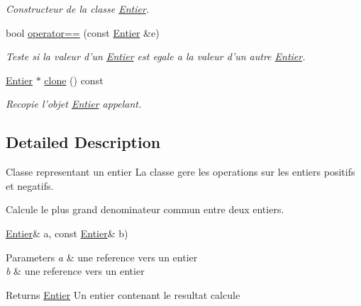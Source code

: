 \begin{DoxyCompactItemize}
\begin{DoxyCompactList}\small\item\em \-Constructeur de la classe \hyperlink{class_l_o21_1_1_entier}{\-Entier}. \end{DoxyCompactList}\item 
bool \hyperlink{class_l_o21_1_1_entier_aefa913cae22177927e3c9d15b00eaac5}{operator==} (const \hyperlink{class_l_o21_1_1_entier}{\-Entier} \&e)
\begin{DoxyCompactList}\small\item\em \-Teste si la valeur d'un \hyperlink{class_l_o21_1_1_entier}{\-Entier} est egale a la valeur d'un autre \hyperlink{class_l_o21_1_1_entier}{\-Entier}. \end{DoxyCompactList}\item 
\hyperlink{class_l_o21_1_1_entier}{\-Entier} $\ast$ \hyperlink{class_l_o21_1_1_entier_a76f8af45d660b33c6e082986be0a9223}{clone} () const 
\begin{DoxyCompactList}\small\item\em \-Recopie l'objet \hyperlink{class_l_o21_1_1_entier}{\-Entier} appelant. \end{DoxyCompactList}\end{DoxyCompactItemize}


\subsection{\-Detailed \-Description}
\-Classe representant un entier \-La classe gere les operations sur les entiers positifs et negatifs. 

\-Calcule le plus grand denominateur commun entre deux entiers.

\hyperlink{class_l_o21_1_1_entier}{\-Entier}\& a, const \hyperlink{class_l_o21_1_1_entier}{\-Entier}\& b) 
\begin{DoxyParams}{\-Parameters}
{\em a} & une reference vers un entier \\
\hline
{\em b} & une reference vers un entier \\
\hline
\end{DoxyParams}
\begin{DoxyReturn}{\-Returns}
\hyperlink{class_l_o21_1_1_entier}{\-Entier} \-Un entier contenant le resultat calcule 
\end{DoxyReturn}


